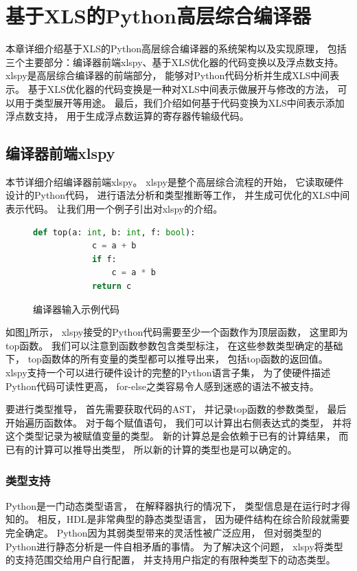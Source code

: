 \section{基于XLS的Python高层综合编译器}

本章详细介绍基于XLS的Python高层综合编译器的系统架构以及实现原理，
包括三个主要部分：编译器前端xlspy、基于XLS优化器的代码变换以及浮点数支持。
xlspy是高层综合编译器的前端部分，
能够对Python代码分析并生成XLS中间表示。
基于XLS优化器的代码变换是一种对XLS中间表示做展开与修改的方法，
可以用于类型展开等用途。
最后，我们介绍如何基于代码变换为XLS中间表示添加浮点数支持，
用于生成浮点数运算的寄存器传输级代码。

\subsection{编译器前端xlspy}

本节详细介绍编译器前端xlspy。
xlspy是整个高层综合流程的开始，
它读取硬件设计的Python代码，
进行语法分析和类型推断等工作，
并生成可优化的XLS中间表示代码。
让我们用一个例子引出对xlspy的介绍。

\begin{figure}[h]
    \begin{lstlisting}[language=Python,frame=single]
        def top(a: int, b: int, f: bool):
            c = a + b
            if f:
                c = a * b
            return c
    \end{lstlisting}
    \caption{编译器输入示例代码}
    \label{code.1}
\end{figure}

如图\ref{code.1}所示，
xlspy接受的Python代码需要至少一个函数作为顶层函数，
这里即为top函数。
我们可以注意到函数参数包含类型标注，
在这些参数类型确定的基础下，
top函数体的所有变量的类型都可以推导出来，
包括top函数的返回值。
xlspy支持一个可以进行硬件设计的完整的Python语言子集，
为了使硬件描述Python代码可读性更高，
for-else之类容易令人感到迷惑的语法不被支持。

要进行类型推导，
首先需要获取代码的AST，
并记录top函数的参数类型，
最后开始遍历函数体。
对于每个赋值语句，
我们可以计算出右侧表达式的类型，
并将这个类型记录为被赋值变量的类型。
新的计算总是会依赖于已有的计算结果，
而已有的计算可以推导出类型，
所以新的计算的类型也是可以确定的。

\subsubsection{类型支持}

Python是一门动态类型语言，
在解释器执行的情况下，
类型信息是在运行时才得知的。
相反，HDL是非常典型的静态类型语言，
因为硬件结构在综合阶段就需要完全确定。
Python因为其弱类型带来的灵活性被广泛应用，
但对弱类型的Python进行静态分析是一件自相矛盾的事情。
为了解决这个问题，
xlspy将类型的支持范围交给用户自行配置，
并支持用户指定的有限种类型下的动态类型。

